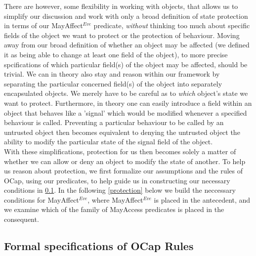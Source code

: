 \documentclass[a4paper,11pt, twoside,twocolumn]{article}
\begin{document}
There are however, some flexibility in working with objects, that allows us to simplify our discussion and work with only a broad definition of state protection in terms of our MayAffect$^{Eve}$ predicate, \textit{without} thinking too much about specific fields of the object we want to protect or the protection of behaviour. Moving away from our broad definition of whether an object may be affected (we defined it as being able to change at least one field of the object), to more precise spcifications of which particular field(s) of the object may be affected, should be trivial. We can in theory also stay and reason within our framework by separating the particular concerned field(s) of the object into separately encapsulated objects. We merely have to be careful as to \textit{which} object's state we want to protect. Furthermore, in theory one can easily introduce a field within an object that behaves like a 'signal' which would be modified whenever a specified behaviour is called. Preventing a particular behaviour to be called by an untrusted object then becomes equivalent to denying the untrusted object the ability to modify the particular state of the signal field of the object.\\

With these simplifications, protection for us then becomes solely a matter of whether we can allow or deny an object to modify the state of another. To help us reason about protection, we first formalize our assumptions and the rules of OCap, using our predicates, to help guide us in constructing our necessary conditions in \ref{ocaprules}. In the following \ref{protection} below we build the neccessary conditions for MayAffect$^{Eve}$, where MayAffect$^{Eve}$ is placed in the antecedent, and we examine which of the family of MayAccess predicates is placed in the consequent. 

\subsection{Formal specifications of OCap Rules}\label{ocaprules}
\end{document}
